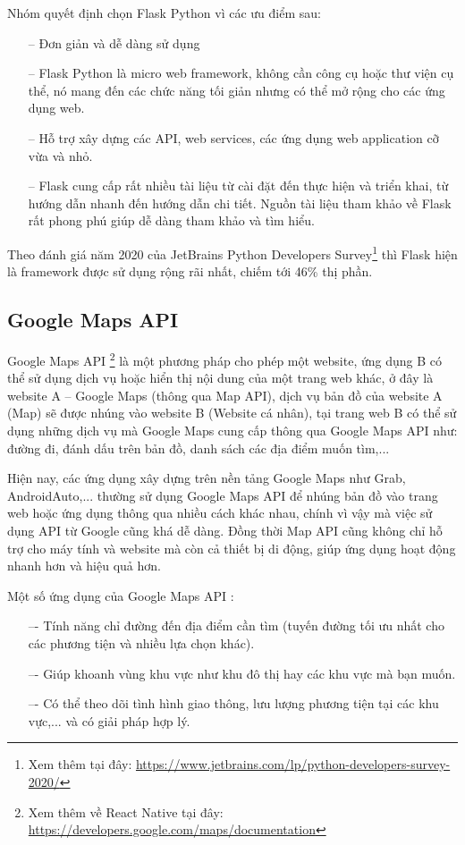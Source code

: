 Nhóm quyết định chọn Flask Python vì các ưu điểm sau:
\begin{itemize}
    \item[--] Đơn giản và dễ dàng sử dụng
    \item[--] Flask Python là micro web framework, không cần công cụ hoặc thư viện cụ thể, nó mang đến các chức năng tối giản nhưng có thể mở rộng cho các ứng dụng web.
    \item[--] Hỗ trợ xây dựng các API, web services, các ứng dụng web application cỡ vừa và nhỏ.
    \item[--] Flask cung cấp rất nhiều tài liệu từ cài đặt đến thực hiện và triển khai, từ hướng dẫn nhanh đến hướng dẫn chi tiết. Nguồn tài liệu tham khảo về Flask rất phong phú giúp dễ dàng tham khảo và tìm hiểu.
\end{itemize}

Theo đánh giá năm 2020 của JetBrains Python Developers Survey\footnote{Xem thêm tại đây: \url{https://www.jetbrains.com/lp/python-developers-survey-2020/}} thì Flask hiện là framework được sử dụng rộng rãi nhất, chiếm tới 46\% thị phần.
\subsection{Google Maps API}
Google Maps API \footnote{Xem thêm về React Native tại đây: \url{https://developers.google.com/maps/documentation}} là một phương pháp cho phép một website, ứng dụng B có thể sử dụng dịch vụ hoặc hiển thị nội dung của một trang web khác, ở đây là website A – Google Maps (thông qua Map API), dịch vụ bản đồ của website A (Map) sẽ được nhúng vào website B (Website cá nhân), tại trang web B có thể sử dụng những dịch vụ mà Google Maps cung cấp thông qua Google Maps API như: đường đi, đánh dấu trên bản đồ, danh sách các địa điểm muốn tìm,...

Hiện nay, các ứng dụng xây dựng trên nền tảng Google Maps như Grab, AndroidAuto,... thường sử dụng Google Maps API để nhúng bản đồ vào trang web hoặc ứng dụng thông qua nhiều cách khác nhau, chính vì vậy mà việc sử dụng API từ Google cũng khá dễ dàng. Đồng thời Map API cũng không chỉ hỗ trợ cho máy tính và website mà còn cả thiết bị di động, giúp ứng dụng hoạt động nhanh hơn và hiệu quả hơn.

Một số ứng dụng của Google Maps API :
\begin{itemize}
    \item[–-] Tính năng chỉ đường đến địa điểm cần tìm (tuyến đường tối ưu nhất cho các phương tiện và nhiều lựa chọn khác).
    \item[–-] Giúp khoanh vùng khu vực như khu đô thị hay các khu vực mà bạn muốn.
    \item[–-] Có thể theo dõi tình hình giao thông, lưu lượng phương tiện tại các khu vực,... và có giải pháp hợp lý.
\end{itemize}
